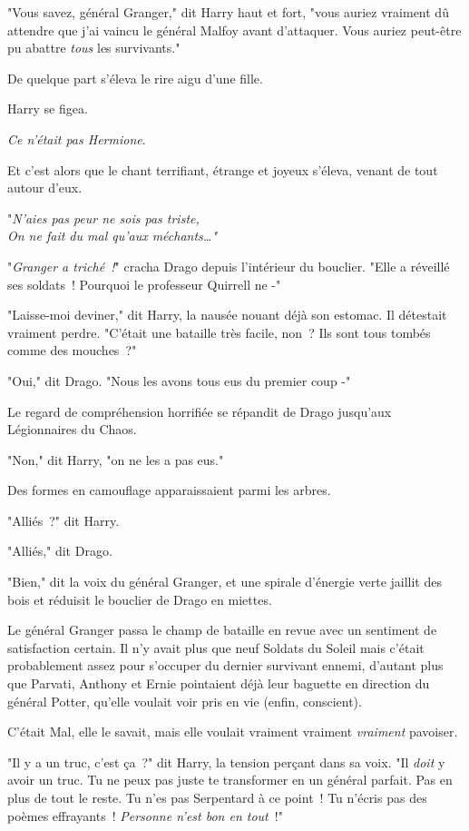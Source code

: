 "Vous savez, général Granger," dit Harry haut et fort, "vous auriez vraiment dû attendre que j'ai vaincu le général Malfoy avant d'attaquer. Vous auriez peut-être pu abattre \emph{tous} les survivants."

De quelque part s'éleva le rire aigu d'une fille.

Harry se figea.

\emph{Ce n'était pas Hermione}.

Et c'est alors que le chant terrifiant, étrange et joyeux s'éleva, venant de tout autour d'eux.

"\emph{N'aies pas peur ne sois pas triste,\\ On ne fait du mal qu'aux méchants…"}

"\emph{Granger a triché~!}" cracha Drago depuis l'intérieur du bouclier. "Elle a réveillé ses soldats~! Pourquoi le professeur Quirrell ne -"

"Laisse-moi deviner," dit Harry, la nausée nouant déjà son estomac. Il détestait vraiment perdre. "C'était une bataille très facile, non~? Ils sont tous tombés comme des mouches~?"

"Oui," dit Drago. "Nous les avons tous eus du premier coup -"

Le regard de compréhension horrifiée se répandit de Drago jusqu'aux Légionnaires du Chaos.

"Non," dit Harry, "on ne les a pas eus."

Des formes en camouflage apparaissaient parmi les arbres.

"Alliés~?" dit Harry.

"Alliés," dit Drago.

"Bien," dit la voix du général Granger, et une spirale d'énergie verte jaillit des bois et réduisit le bouclier de Drago en miettes.

\later

Le général Granger passa le champ de bataille en revue avec un sentiment de satisfaction certain. Il n'y avait plus que neuf Soldats du Soleil mais c'était probablement assez pour s'occuper du dernier survivant ennemi, d'autant plus que Parvati, Anthony et Ernie pointaient déjà leur baguette en direction du général Potter, qu'elle voulait voir pris en vie (enfin, conscient).

C'était Mal, elle le savait, mais elle voulait vraiment vraiment \emph{vraiment} pavoiser.

"Il y a un truc, c'est ça~?" dit Harry, la tension perçant dans sa voix. "Il \emph{doit} y avoir un truc. Tu ne peux pas juste te transformer en un général parfait. Pas en plus de tout le reste. Tu n'es pas Serpentard à ce point~! Tu n'écris pas des poèmes effrayants~! \emph{Personne n'est bon en tout}~!"

